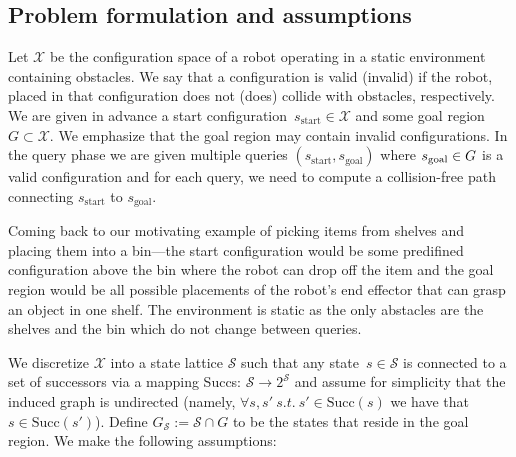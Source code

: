 \documentclass[letterpaper]{article} %
\newcommand{\calX}{\ensuremath{\mathcal{X}}\xspace}
\newcommand{\calS}{\ensuremath{\mathcal{S}}\xspace}
\newcommand{\sStart}{\ensuremath{s_{\text{start}}\xspace}}
\begin{document}
\subsection{Problem formulation and assumptions}
\label{sec:pdef}
Let $\calX$ be the configuration space of a robot operating in a static environment containing obstacles.
We say that a configuration is valid (invalid) if the robot, placed in that configuration does not (does) collide with obstacles, respectively.
We are given in advance a start configuration~$\sStart \in \calX$ and some goal region~$G \subset \calX$.
We emphasize that the goal region may contain invalid configurations.
In the query phase we are given multiple queries $(\sStart, s_{\text{goal}})$ where $s_{\rm goal} \in G$ is a valid configuration and for each query, we need to compute a collision-free path connecting $\sStart$ to $s_{\text{goal}}$.

Coming back to our motivating example of picking items from  shelves and placing them into a bin---the start configuration would be some predifined configuration above the bin where the robot can drop off the item and the goal region would be all possible placements of the robot's end effector that can grasp an object in one shelf. The environment is static as the only abstacles are the shelves and the bin which do not change between queries.

We discretize $\calX$ into a state lattice $\calS$ such that any state~$s \in \calS$ is connected to a set of successors via a mapping Succs: $\calS \rightarrow 2^\calS$ and assume for simplicity  that the induced graph is undirected (namely, $\forall s,s'~s.t.~ s' \in \text{Succ} (s)$ we have that $s \in \text{Succ} (s')$).
Define $G_\calS := \calS \cap G$ to be the states that reside in the goal region.
We make the following assumptions:
\end{document}
